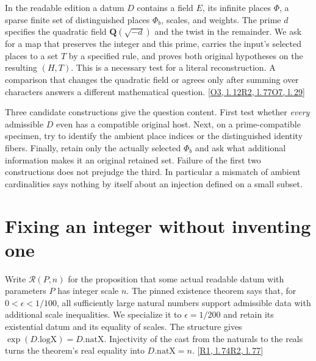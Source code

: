 \documentclass[12pt,letterpaper]{article}
\begin{document}
In the readable edition a datum $D$ contains a field $E$, its infinite places $\Phi$, a sparse finite set of distinguished places $\Phi_b$, scales, and weights. The prime $d$ specifies the quadratic field $\mathbf Q(\sqrt{-d})$ and the twist in the remainder. We ask for a map that preserves the integer and this prime, carries the input's selected places to a set $T$ by a specified rule, and proves both original hypotheses on the resulting $(H,T)$. This is a necessary test for a literal reconstruction. A comparison that changes the quadratic field or agrees only after summing over characters answers a different mathematical question.
 {\footnotesize\sffamily\color{mute}[\href{https://github.com/nousentllc/riemann-hypothesis/blob/40e56bab026552e089d7afcfeff08d2defb9c005/src/Formalism/SharpRestriction/RamificationFrobenius/TotientGaloisClasses/ConjEMemHostFIff.lean\#L12}{O3, l.\,12}\enspace \href{https://github.com/leanprover-community/riemann-hypothesis/blob/e063a923620ee7787b4a1270421478645bf66bdb/src/New/Reduction/Data/AdmissibleData.lean\#L77}{R2, l.\,77}\enspace \href{https://github.com/nousentllc/riemann-hypothesis/blob/40e56bab026552e089d7afcfeff08d2defb9c005/src/Development/AutomorphicArithmetic/PrimitiveCosets/CoreAtH.lean\#L29}{O7, l.\,29}]}
 
Three candidate constructions give the question content. First test whether \emph{every} admissible $D$ even has a compatible original host. Next, on a prime-compatible specimen, try to identify the ambient place indices or the distinguished identity fibers. Finally, retain only the actually selected $\Phi_b$ and ask what additional information makes it an original retained set. Failure of the first two constructions does not prejudge the third. In particular a mismatch of ambient cardinalities says nothing by itself about an injection defined on a small subset.

\section{Fixing an integer without inventing one}\label{sec:scale}
Write $\mathcal R(P,n)$ for the proposition that some actual readable datum with parameters $P$ has integer scale $n$. The pinned existence theorem says that, for $0<\epsilon<1/100$, all sufficiently large natural numbers support admissible data with additional scale inequalities. We specialize it to $\epsilon=1/200$ and retain its existential datum and its equality of scales. The structure gives $\exp(D.\mathrm{logX})=D.\mathrm{natX}$. Injectivity of the cast from the naturals to the reals turns the theorem's real equality into $D.\mathrm{natX}=n$. {\footnotesize\sffamily\color{mute}[\href{https://github.com/leanprover-community/riemann-hypothesis/blob/e063a923620ee7787b4a1270421478645bf66bdb/src/New/Reduction/OneSidedBound.lean\#L74}{R1, l.\,74}\enspace \href{https://github.com/leanprover-community/riemann-hypothesis/blob/e063a923620ee7787b4a1270421478645bf66bdb/src/New/Reduction/Data/AdmissibleData.lean\#L77}{R2, l.\,77}]}
\end{document}
